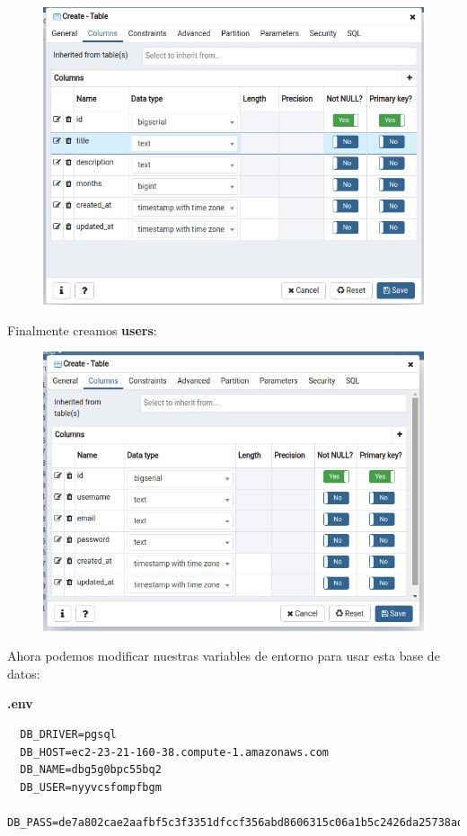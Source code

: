 \documentclass{article}
\begin{document}
\begin{figure}[h!]
  \centering
  \includegraphics[scale=0.5]{./Pictures/279_projects.png}
\end{figure}

Finalmente creamos \textbf{users}:

\begin{figure}[h!]
  \centering
  \includegraphics[scale=0.5]{./Pictures/280_users.png}
\end{figure}

Ahora podemos modificar nuestras variables de entorno para usar esta base de datos:

\textbf{.env}
\begin{verbatim}
  DB_DRIVER=pgsql
  DB_HOST=ec2-23-21-160-38.compute-1.amazonaws.com
  DB_NAME=dbg5g0bpc55bq2
  DB_USER=nyyvcsfompfbgm
  DB_PASS=de7a802cae2aafbf5c3f3351dfccf356abd8606315c06a1b5c2426da25738ad6
\end{verbatim}
\end{document}

